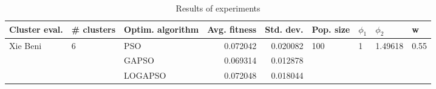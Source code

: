 \begin{table}
\centering
\caption{Results of experiments}
\begin{tabular}{lllrrllll}
\toprule
            Cluster eval. &        \# clusters & Optim. algorithm &  Avg. fitness &  Std. dev. &            Pop. size &         $\phi_{1}$ &               $\phi_{2}$ &                     w \\
\midrule
\multirow{3}{*}{Xie Beni} & \multirow{3}{*}{6} &              PSO &      0.072042 &   0.020082 & \multirow{3}{*}{100} & \multirow{3}{*}{1} & \multirow{3}{*}{1.49618} & \multirow{3}{*}{0.55} \\
                          &                    &            GAPSO &      0.069314 &   0.012878 &                      &                    &                          &                       \\
                          &                    &          LOGAPSO &      0.072048 &   0.018044 &                      &                    &                          &                       \\
\bottomrule
\end{tabular}
\end{table}
